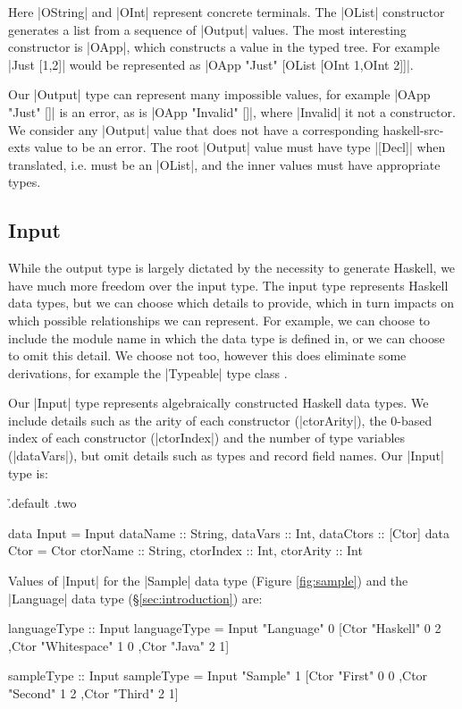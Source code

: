 \documentclass[preprint,draft]{sigplanconf}
\begin{document}
Here |OString| and |OInt| represent concrete terminals. The |OList| constructor generates a list from a sequence of  |Output| values. The most interesting constructor is |OApp|, which constructs a value in the typed tree. For example |Just [1,2]| would be represented as |OApp "Just" [OList [OInt 1,OInt 2]]|.

Our |Output| type can represent many impossible values, for example |OApp "Just" []| is an error, as is |OApp "Invalid" []|, where |Invalid| it not a constructor. We consider any |Output| value that does not have a corresponding haskell-src-exts value to be an error. The root |Output| value must have type |[Decl]| when translated, i.e. must be an |OList|, and the inner values must have appropriate types.

\subsection{Input}

While the output type is largely dictated by the necessity to generate Haskell, we have much more freedom over the input type. The input type represents Haskell data types, but we can choose which details to provide, which in turn impacts on which possible relationships we can represent. For example, we can choose to include the module name in which the data type is defined in, or we can choose to omit this detail. We choose not too, however this does eliminate some derivations, for example the |Typeable| type class \cite{lammel:syb}.

Our |Input| type represents algebraically constructed Haskell data types. We include details such as the arity of each constructor (|ctorArity|), the 0-based index of each constructor (|ctorIndex|) and the number of type variables (|dataVars|), but omit details such as types and record field names. Our |Input| type is:

\h{.default .two}\begin{code}
data Input = Input
    {dataName :: String, dataVars :: Int, dataCtors :: [Ctor]}
data Ctor = Ctor
    {ctorName :: String, ctorIndex :: Int, ctorArity :: Int}
\end{code}

\noindent Values of |Input| for the |Sample| data type (Figure \ref{fig:sample}) and the |Language| data type (\S\ref{sec:introduction}) are:

\begin{code}
languageType :: Input
languageType = Input "Language" 0
    [Ctor "Haskell" 0 2
    ,Ctor "Whitespace" 1 0
    ,Ctor "Java" 2 1]

sampleType :: Input
sampleType = Input "Sample" 1
    [Ctor "First" 0 0
    ,Ctor "Second" 1 2
    ,Ctor "Third" 2 1]
\end{code}
\end{document}
